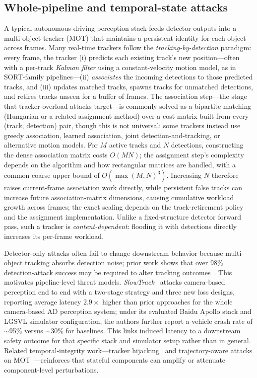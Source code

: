 \documentclass[acmsmall,screen,review,nonacm]{acmart}
\begin{document}
\subsection{Whole-pipeline and temporal-state attacks}
A typical autonomous-driving perception stack feeds detector outputs into a multi-object tracker (MOT) that maintains a persistent identity for each object across frames. Many real-time trackers follow the \emph{tracking-by-detection} paradigm: every frame, the tracker (i) predicts each existing track's new position---often with a per-track \emph{Kalman filter} using a constant-velocity motion model, as in SORT-family pipelines---(ii) \emph{associates} the incoming detections to those predicted tracks, and (iii) updates matched tracks, spawns tracks for unmatched detections, and retires tracks unseen for a buffer of frames. The association step---the stage that tracker-overload attacks target---is commonly solved as a bipartite matching (Hungarian or a related assignment method) over a cost matrix built from every (track, detection) pair, though this is not universal: some trackers instead use greedy association, learned association, joint detection-and-tracking, or alternative motion models. For $M$ active tracks and $N$ detections, constructing the dense association matrix costs $O(MN)$; the assignment step's complexity depends on the algorithm and how rectangular matrices are handled, with a common coarse upper bound of $O(\max(M,N)^3)$. Increasing $N$ therefore raises current-frame association work directly, while persistent false tracks can increase future association-matrix dimensions, causing cumulative workload growth across frames; the exact scaling depends on the track-retirement policy and the assignment implementation. Unlike a fixed-structure detector forward pass, such a tracker is \emph{content-dependent}: flooding it with detections directly increases its per-frame workload.

Detector-only attacks often fail to change downstream behavior because multi-object tracking absorbs detection noise; prior work shows that over 98\% detection-attack success may be required to alter tracking outcomes~\cite{jia2020fooling}. This motivates pipeline-level threat models. \emph{SlowTrack}~\cite{ma2024slowtrack} attacks camera-based perception end to end with a two-stage strategy and three new loss designs, reporting average latency $2.9\times$ higher than prior approaches for the whole camera-based AD perception system; under its evaluated Baidu Apollo stack and LGSVL simulator configuration, the authors further report a vehicle crash rate of $\sim$95\% versus $\sim$30\% for baselines. This links induced latency to a downstream safety outcome for that specific stack and simulator setup rather than in general. Related temporal-integrity work---tracker hijacking~\cite{jia2020fooling,ma2023wip} and trajectory-aware attacks on MOT~\cite{hu2026trajectory}---reinforces that stateful components can amplify or attenuate component-level perturbations.
\end{document}
